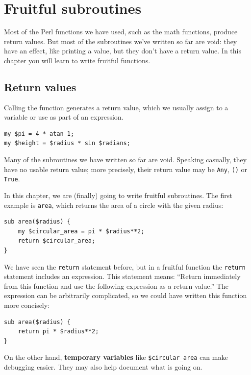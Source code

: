 
\chapter{Fruitful subroutines}
\label{fruitchap}

Most of the Perl functions we have used, such as the math
functions, produce return values.  But most of the subroutines 
we've written so far are void: they have an effect, like printing 
a value, but they don't have a return value.  In
this chapter you will learn to write fruitful functions.


\section{Return values}

Calling the function generates a return
value, which we usually assign to a variable or use as part of an
expression.

\begin{verbatim}
my $pi = 4 * atan 1;
my $height = $radius * sin $radians;
\end{verbatim}
%
Many of the subroutines we have written so far are void.  
Speaking casually,
they have no usable return value; more precisely,
their return value may be {\tt Any}, {\tt ()} or {\tt True}.

In this chapter, we are (finally) going to write fruitful subroutines.
The first example is {\tt area}, which returns the area of a circle
with the given radius:

\begin{verbatim}
sub area($radius) {
    my $circular_area = pi * $radius**2;
    return $circular_area;
}
\end{verbatim}
%
We have seen the {\tt return} statement before, but in a fruitful
function the {\tt return} statement includes
an expression.  This statement means: ``Return immediately from
this function and use the following expression as a return value.''
The expression can be arbitrarily complicated, so we could
have written this function more concisely:

\begin{verbatim}
sub area($radius) {
    return pi * $radius**2;
}
\end{verbatim}
%
On the other hand, {\bf temporary variables} like 
\verb'$circular_area' can make debugging easier. They 
may also help document what is going on.

